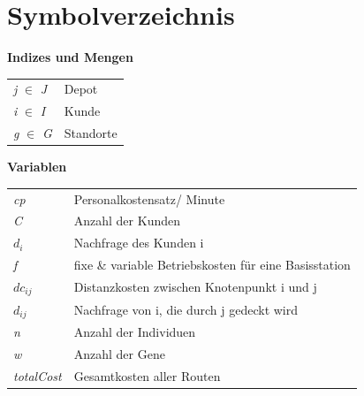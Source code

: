 \documentclass[a4paper,12pt,parskip,bibtotoc,liststotoc]{article}
\begin{document}
\newpage
\section*{Symbolverzeichnis}

\textbf{Indizes und Mengen}

\begin{table}[h!]
    \vspace*{-3mm}
    \hspace*{2mm}
  \renewcommand{\arraystretch}{1,5}
    \begin{tabular}{ll}  %
 
\textit{j} $\in$ \textit{J} & Depot\\

\textit{i} $\in$ \textit{I} & Kunde\\

\textit{g} $\in$ \textit{G} & Standorte\\



\end{tabular}
\end{table}


\textbf{Variablen}


\begin{table}[h!]
    \vspace*{-3mm}
    \hspace*{2mm}
  \renewcommand{\arraystretch}{1,5}
    \begin{tabular}{ll}

\textit{cp} & Personalkostensatz/ Minute\\

\textit{C} & Anzahl der Kunden\\

\textit{$d_{i}$} & Nachfrage des Kunden i\\

\textit{f} & fixe \& variable Betriebskosten für eine Basisstation\\

$dc_{ij}$ & Distanzkosten zwischen Knotenpunkt i und j\\

$d_{ij}$ & Nachfrage von i, die durch j gedeckt wird\\

\textit{n} & Anzahl der Individuen \\

\textit{w} & Anzahl der Gene\\

\textit{totalCost} & Gesamtkosten aller Routen\\


\end{tabular}
\end{table}
\end{document}
